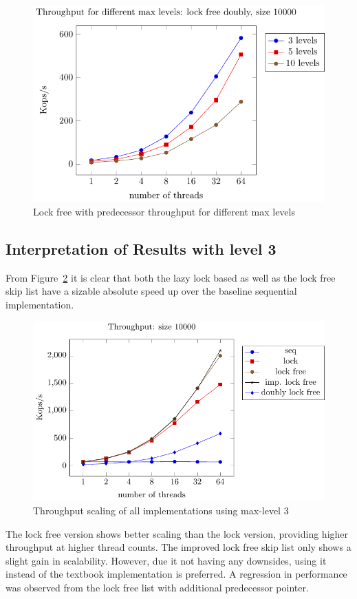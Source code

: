 \documentclass{article}
\begin{document}
\begin{figure}[H]
    \centering
    \includegraphics[width=\textwidth]{plots_for_report/lfree_pred_levels_plot.pdf}
    \caption{Lock free with predecessor throughput for different max levels}
    \label{fig:lfree_pred_levels}
\end{figure}

\subsection{Interpretation of Results with level 3}
From Figure~\ref{fig:throughput_all} it is clear that both the lazy lock based as well as the lock free skip list have a sizable absolute speed up over the baseline sequential implementation.
\begin{figure}[ht!]
  \centering
  \includegraphics[width=\textwidth]{plots_for_report/throughput_plot.pdf}
  \caption{Throughput scaling of all implementations using max-level 3}
  \label{fig:throughput_all}
\end{figure}
The lock free version shows better scaling than the lock version, providing higher throughput at higher thread counts.
The improved lock free skip list only shows a slight gain in scalability.
However, due it not having any downsides, using it instead of the textbook implementation is preferred.
A regression in performance was observed from the lock free list with additional predecessor pointer.
\end{document}
